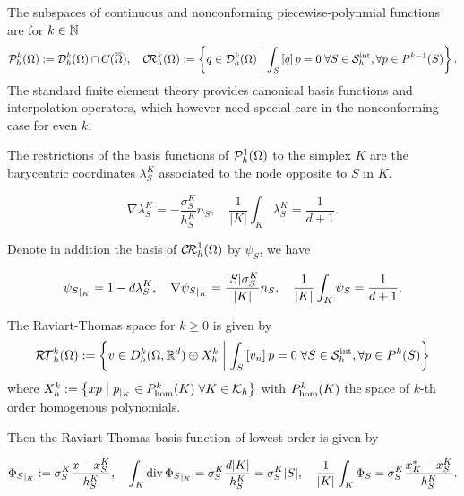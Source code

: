 The subspaces of continuous and nonconforming piecewise-polynmial functions are for $k\in\mathbb N$
%
\begin{equation}\label{eq:}
\mathcal{P}_h^k(\Omega) := \mathcal{D}_h^k(\Omega)\cap C(\overline{\Omega}),\quad
\mathcal{C\!R}_h^k(\Omega) := \left\{q \in \mathcal{D}_h^k(\Omega)\;\middle|\;\int_S\left[q\right]p=0\;\forall S\in\mathcal S^{\rm int}_h,\forall p\in P^{k-1}(S)\right\}.
\end{equation}
%  
The standard finite element theory provides canonical basis functions and interpolation operators, which however need special care in the nonconforming case for even $k$. 


The restrictions of the basis functions of $\mathcal{P}^1_h(\Omega)$ to the simplex $K$ are the barycentric coordinates $\lambda_S^K$ associated to the node opposite to $S$ in $K$.
%
\begin{yellow}
\begin{equation}\label{eq:}
\nabla \lambda_S^K = -\frac{\sigma_{S}^K}{h_S^K}n_S,\quad \frac{1}{|K|}\int_K \lambda_S^K = \frac{1}{d+1}.
\end{equation}
\end{yellow}%
%

Denote in addition the basis of $\mathcal{C\!R}^1_h(\Omega)$ by $\psi_S$, we have
%
\begin{yellow}
\begin{equation}\label{eq:}
{\psi_S}_{|_{K}} = 1- d \lambda_S^K, \quad \nabla {\psi_S}_{|_{K}} =
\frac{|S|\sigma_{S}^K}{|K|}n_S,\quad \frac{1}{|K|}\int_K \psi_S = \frac{1}{d+1}.
\end{equation}
\end{yellow}%
%

The Raviart-Thomas space for $k\ge0$ is given by
%
\begin{equation}\label{eq:}
\mathcal{R\!T}^k_h(\Omega):= \left\{v\in D^k_h(\Omega,\mathbb R^d)\oplus X^k_h\;\middle|\;\int_S\left[v_n\right]p=0\;\forall S\in\mathcal S^{\rm int}_h,\forall p\in P^{k}(S)\right\}
\end{equation}
%
where $X^k_h:=\left\{xp\;\middle|\;{p}_{|_{K}}\in P_{\rm hom}^{k}(K)\; \forall K\in\mathcal K_h\right\}$ with $P_{\rm hom}^{k}(K)$ the space of $k$-th order homogenous polynomials.

Then the Raviart-Thomas basis function of lowest order is given by
%
\begin{yellow}
\begin{equation}\label{eq:BasisFctRt}
{\Phi_S}_{|_{K}} := \sigma_{S}^K \frac{x-x_S^K}{h_S^K},\quad 
\int_K \operatorname{div} {\Phi_S}_{|_{K}} = \sigma_{S}^K \frac{d|K|}{h_S^K}=  \sigma_{S}^K|S|,\quad \frac{1}{|K|}\int_K \Phi_S = \sigma_{S}^K\frac{x_K^* - x_S^K}{h_S^K}.
\end{equation}
\end{yellow}%

%

\printbibliography[title=References Section~\thesection]

